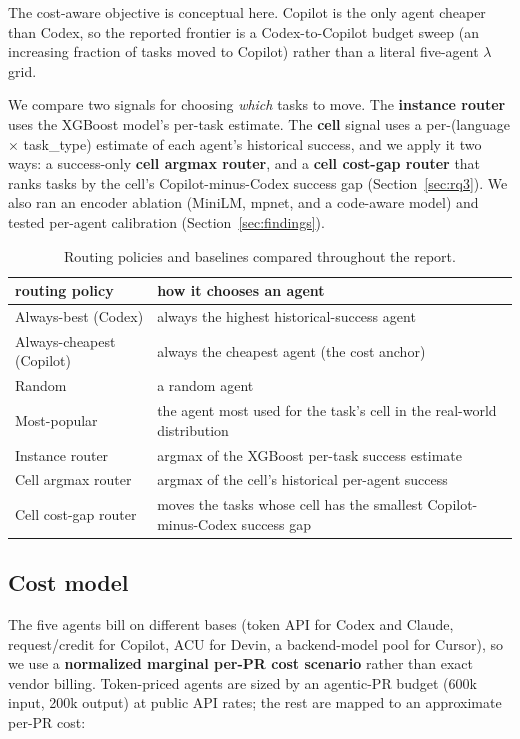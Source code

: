 \documentclass[sigconf,nonacm]{acmart}
\begin{document}
The cost-aware objective is conceptual here. Copilot is the only agent cheaper than Codex, so the reported frontier is a Codex-to-Copilot budget sweep (an increasing fraction of tasks moved to Copilot) rather than a literal five-agent $\lambda$ grid.

We compare two signals for choosing \emph{which} tasks to move. The \textbf{instance router} uses the XGBoost model's per-task estimate. The \textbf{cell} signal uses a per-(language $\times$ task\_type) estimate of each agent's historical success, and we apply it two ways: a success-only \textbf{cell argmax router}, and a \textbf{cell cost-gap router} that ranks tasks by the cell's Copilot-minus-Codex success gap (Section~\ref{sec:rq3}). We also ran an encoder ablation (MiniLM, mpnet, and a code-aware model) and tested per-agent calibration (Section~\ref{sec:findings}).

\begin{table}[t]
  \centering
  \caption{Routing policies and baselines compared throughout the report.}
  \label{tab:policies}
  \begin{tabular}{p{}p{}}
    \toprule
    routing policy & how it chooses an agent \\
    \midrule
    Always-best (Codex) & always the highest historical-success agent \\
    Always-cheapest (Copilot) & always the cheapest agent (the cost anchor) \\
    Random & a random agent \\
    Most-popular & the agent most used for the task's cell in the real-world distribution \\
    Instance router & argmax of the XGBoost per-task success estimate \\
    Cell argmax router & argmax of the cell's historical per-agent success \\
    Cell cost-gap router & moves the tasks whose cell has the smallest Copilot-minus-Codex success gap \\
    \bottomrule
  \end{tabular}
\end{table}

\subsection{Cost model}\label{sec:cost}

The five agents bill on different bases (token API for Codex and Claude, request/credit for Copilot, ACU for Devin, a backend-model pool for Cursor), so we use a \textbf{normalized marginal per-PR cost scenario} rather than exact vendor billing. Token-priced agents are sized by an agentic-PR budget (600k input, 200k output) at public API rates; the rest are mapped to an approximate per-PR cost:
\end{document}
